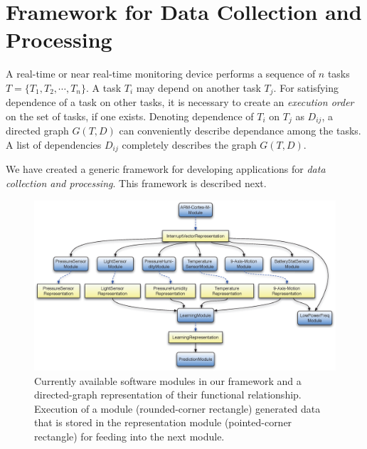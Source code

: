 \documentclass[]{IEEEtran}
\begin{document}




\section{Framework for Data Collection and Processing}
\label{sec:framework}

A real-time or near real-time monitoring device performs a sequence of $n$ tasks $T = \{ T_1, T_2,\cdots,T_n\}$. A task $T_i$ may depend on another task $T_j$.  For satisfying dependence of a task on other tasks, it is necessary to create an \emph{execution order} on the set of tasks, if one exists. Denoting dependence of $T_i$ on $T_j$ as $D_{ij}$, a directed graph $G(T,D)$ can conveniently describe dependance among the tasks. A list of dependencies $D_{ij}$ completely describes the graph $G(T,D)$.
\par
We have created a generic framework for developing applications for \emph{data collection and processing}. This framework is described next.

\begin{figure}[!t]
\centering
\includegraphics[width=\textwidth]{figures/graph_structure_def-crop3.eps}
\caption{Currently available software modules in our framework and a directed-graph representation of their functional relationship. Execution of a module (rounded-corner rectangle) generated data that is stored in the representation module (pointed-corner rectangle) for feeding into the next module.}
 \label{fig:framework}
\end{figure}
\end{document}
